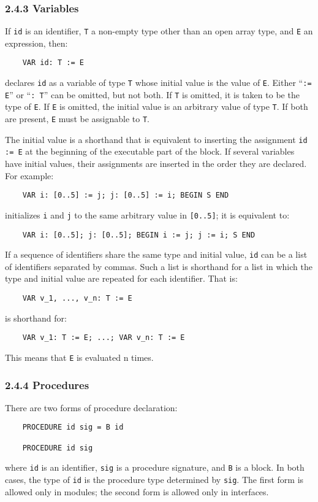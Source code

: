 \documentclass[10pt]{article}
\begin{document}
\subsubsection*{2.4.3 Variables}

If \verb|id| is an identifier, \verb|T| a non-empty type other than an open
array type, and \verb|E| an expression, then:
\begin{verbatim}
    VAR id: T := E
\end{verbatim}
declares \verb|id| as a variable of type \verb|T| whose initial value is the
value of \verb|E|.  Either ``\verb|:= E|'' or ``\verb|: T|'' can be omitted,
but not both.  If \verb|T| is omitted, it is taken to be the type of \verb|E|.
If \verb|E| is omitted, the initial value is an arbitrary value of type
\verb|T|.  If both are present, \verb|E| must be assignable to \verb|T|.

The initial value is a shorthand that is equivalent to inserting the
assignment \verb|id := E| at the beginning of the executable part of the
block.  If several variables have initial values, their assignments are
inserted in the order they are declared.  For example:
\begin{verbatim}
    VAR i: [0..5] := j; j: [0..5] := i; BEGIN S END
\end{verbatim}
initializes \verb|i| and \verb|j| to the same arbitrary value in
\verb|[0..5]|; it is equivalent to:
\begin{verbatim}
    VAR i: [0..5]; j: [0..5]; BEGIN i := j; j := i; S END
\end{verbatim}

If a sequence of identifiers share the same type and initial value, \verb|id|
can be a list of identifiers separated by commas.  Such a list is shorthand
for a list in which the type and initial value are repeated for each
identifier.  That is:
\begin{verbatim}
    VAR v_1, ..., v_n: T := E
\end{verbatim}
is shorthand for:
\begin{verbatim}
    VAR v_1: T := E; ...; VAR v_n: T := E
\end{verbatim}
This means that \verb|E| is evaluated n times.

\subsubsection*{2.4.4 Procedures}

There are two forms of procedure declaration:
\begin{verbatim}
    PROCEDURE id sig = B id

    PROCEDURE id sig
\end{verbatim}
where \verb|id| is an identifier, \verb|sig| is a procedure signature, and
\verb|B| is a block.  In both cases, the type of \verb|id| is the procedure
type determined by \verb|sig|.  The first form is allowed only in modules; the
second form is allowed only in interfaces.
\end{document}
